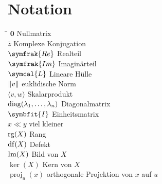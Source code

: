 \chapter*{Notation}
\begin{tabbing}
    \hspace{4cm} \= \kill
    \(\symbf{0}\) \> Nullmatrix \\
    \(\overline{z}\) \>  Komplexe Konjugation \\
    \(\symfrak{Re}\) \>  Realteil \\
    \(\symfrak{Im}\) \>  Imaginärteil \\
    \(\symcal{L}\)   \>  Lineare Hülle \\ 
    \(\lVert v\rVert\)     \>  euklidische Norm \\ 
    \(\langle v,w \rangle\) \> Skalarprodukt \\
    \(\operatorname{diag}(\lambda_1,\ldots,\lambda_n)\) \> Diagonalmatrix \\
    \(\symbfit{I}\) \> Einheitsmatrix \\
    \(x \ll y\) \> viel kleiner \\
    \(\operatorname{rg}(X)\) \> Rang \\
    \(\operatorname{df}(X)\) \> Defekt \\
    \(\operatorname{Im}(X)\) \> Bild von \(X\) \\
    \(\ker(X)\) \> Kern von \(X\) \\
    \(\operatorname{proj}_{u}(x)\) \> orthogonale Projektion von \(x\) auf \(u\) 
\end{tabbing}